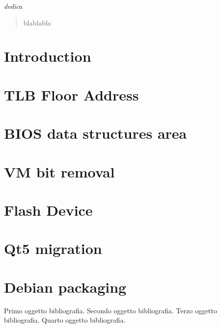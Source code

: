 \documentclass[12pt,a4paper,openright,twoside]{report}
\begin{document}

\clearpage{\pagestyle{empty}\cleardoublepage}
\begin{titlepage}
\thispagestyle{empty}
\topmargin=6.5cm
\raggedleft
\large
\em
dedica
\newpage
\clearpage{\pagestyle{empty}\cleardoublepage}
\end{titlepage}
\begin{abstract}
blablabla
\end{abstract}
\clearpage{\pagestyle{empty}\cleardoublepage}
\tableofcontents
\thispagestyle{empty}
\clearpage{\pagestyle{empty}\cleardoublepage}
\chapter{Introduction}
\lhead[\fancyplain{}{\bfseries\thepage}]{\fancyplain{}{\bfseries\rightmark}}
\chapter{TLB Floor Address}
\lhead[\fancyplain{}{\bfseries\thepage}]{\fancyplain{}{\bfseries\rightmark}}
\chapter{BIOS data structures area}
\lhead[\fancyplain{}{\bfseries\thepage}]{\fancyplain{}{\bfseries\rightmark}}
\chapter{VM bit removal}
\lhead[\fancyplain{}{\bfseries\thepage}]{\fancyplain{}{\bfseries\rightmark}}
\chapter{Flash Device}
\lhead[\fancyplain{}{\bfseries\thepage}]{\fancyplain{}{\bfseries\rightmark}}
\chapter{Qt5 migration}
\lhead[\fancyplain{}{\bfseries\thepage}]{\fancyplain{}{\bfseries\rightmark}}
\chapter{Debian packaging}
\lhead[\fancyplain{}{\bfseries\thepage}]{\fancyplain{}{\bfseries\rightmark}}
\begin{thebibliography}{99}
 Primo oggetto bibliografia.
 Secondo oggetto bibliografia.
 Terzo oggetto bibliografia.
 Quarto oggetto bibliografia.
\end{thebibliography}
\end{document}
